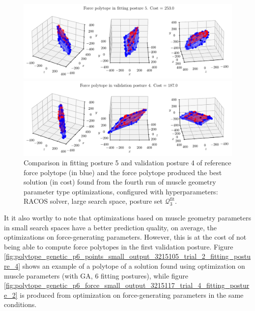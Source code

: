 \clearpage
\begin{figure}[!htb]
    \centering
    \captionsetup{justification=centering}
    
    \begin{minipage}{0.8\linewidth}
        \captionsetup{justification=centering}
        \centering
        \includegraphics[trim={0 0 0 0}, clip, width=1\linewidth]{img/chapter_4/reconstruction_stanford_imgs/polytope_racos_p3_points_large_output_3206053_trial_4_fitting_posture_5_with_stanford.pdf}
    \end{minipage}
    \begin{minipage}{0.8\linewidth}
        \captionsetup{justification=centering}
        \centering
        \includegraphics[trim={0 0 0 0}, clip, width=1\linewidth]{img/chapter_4/reconstruction_stanford_imgs/polytope_racos_p3_points_large_output_3206053_trial_4_val_posture_4_with_stanford.pdf}
    \end{minipage}
    \caption{Comparison in fitting posture 5 and validation posture 4 of reference force polytope (in blue) and the force polytope produced the best solution (in cost) found from the fourth run of muscle geometry parameter type optimizations, configured with hyperparameters: RACOS solver, large search space, posture set $\mathcal{Q}_3^{\text{fit}}$.}
    \label{fig:polytope_racos_p3_points_large_output_3206053_trial_4_fitting_posture_5}
\end{figure}

It it also worthy to note that optimizations based on muscle geometry parameters in small search spaces have a better prediction quality, on average, the optimizations on force-generating parameters. However, this is at the cost of not being able to compute force polytopes in the first validation posture. Figure \ref{fig:polytope_genetic_p6_points_small_output_3215105_trial_2_fitting_posture_4} shows an example of a polytope of a solution found using optimization on muscle parameters (with GA, 6 fitting postures), while figure \ref{fig:polytope_genetic_p6_force_small_output_3215117_trial_4_fitting_posture_2} is produced from optimization on force-generating parameters in the same conditions.

